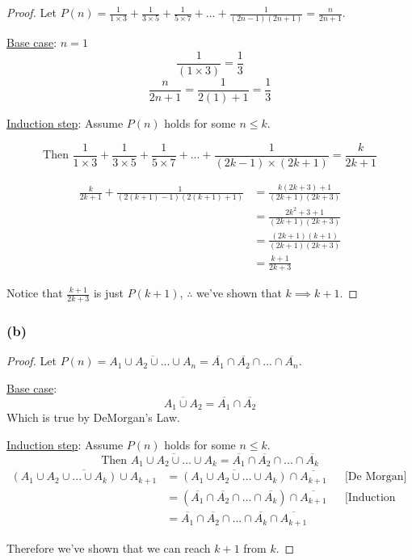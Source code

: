 \documentclass[10pt]{article}
\begin{document}
\begin{proof}
  Let $P(n) = \frac{1}{1 \times 3} + \frac{1}{3 \times 5} + \frac{1}{5 \times 7} + ... + \frac{1}{(2n - 1)(2n + 1)} = \frac{n}{2n + 1}$. \spacing

  \noindent
  \underline{Base case}: $n = 1$
  $$ \frac{1}{(1 \times 3)} = \frac{1}{3} $$
  $$ \frac{n}{2n + 1} = \frac{1}{2(1) + 1} = \frac{1}{3} $$ \spacing

  \noindent
  \underline{Induction step}:
  Assume $P(n)$ holds for some $n \le k$.

  $$ \text{Then } \frac{1}{1 \times 3} + \frac{1}{3 \times 5} + \frac{1}{5 \times 7} + ... + \frac{1}{(2k - 1) \times (2k + 1)} = \frac{k}{2k + 1} $$

  \begin{align*}
    \frac{k}{2k + 1} + \frac{1}{(2(k + 1) - 1)(2(k + 1) + 1)} &= \frac{k(2k + 3) + 1}{(2k + 1)(2k + 3)} \\
      &= \frac{2k^2 + 3 + 1}{(2k + 1)(2k + 3)} \\
      &= \frac{(2k + 1)(k + 1)}{(2k + 1)(2k + 3)} \\
      &= \frac{k + 1}{2k + 3}
  \end{align*}

  \noindent
  Notice that $\frac{k + 1}{2k + 3}$ is just $P(k + 1)$, $\therefore$ we've shown that $k \implies k + 1$.
\end{proof}

\subsubsection*{(b)}

\begin{proof}
  Let $P(n) = \overline{A_{1} \cup A_{2} \cup ... \cup A_{n}} = \overline{A_{1}} \cap \overline{A_{2}} \cap ... \cap \overline{A_{n}}$. \spacing

  \noindent
  \underline{Base case}:
  $$\overline{A_{1} \cup A_{2}} = \overline{A_{1}} \cap \overline{A_{2}}$$
  Which is true by DeMorgan's Law.
  \spacing

  \noindent
  \underline{Induction step}:
  Assume $P(n)$ holds for some $n \le k$.
  $$\text{Then } \overline{A_{1} \cup A_{2} \cup ... \cup A_{k}} = \overline{A_{1}} \cap \overline{A_{2}} \cap ... \cap \overline{A_{k}}$$
  \begin{align*}
  \overline{(A_{1} \cup A_{2} \cup ... \cup A_{k}) \cup A_{k + 1}} &= \overline{(A_{1} \cup A_{2} \cup ... \cup A_{k})} \cap \overline{A_{k+1}} && \text{[De Morgan]}\\
    &= (\overline{A_{1}} \cap \overline{A_{2}} \cap ... \cap \overline{A_{k}}) \cap \overline{A_{k + 1}} && \text{[Induction Hypothesis]} \\
    &= \overline{A_{1}} \cap \overline{A_{2}} \cap ... \cap \overline{A_{k}} \cap \overline{A_{k + 1}}
  \end{align*}

  \noindent
  Therefore we've shown that we can reach $k + 1$ from $k$.
\end{proof}
\end{document}

